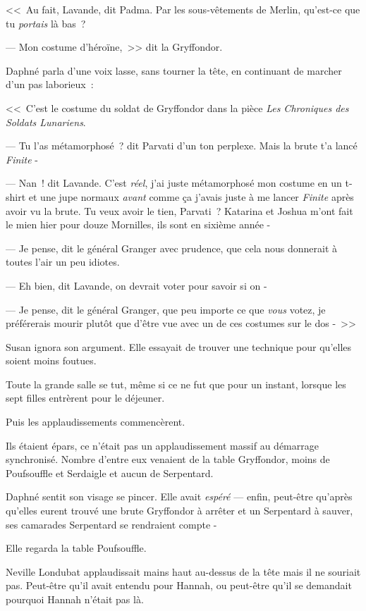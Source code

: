<<~Au fait, Lavande, dit Padma. Par les sous-vêtements de Merlin, qu'est-ce que tu \emph{portais} là bas~?

--- Mon costume d'héroïne,~>> dit la Gryffondor.

Daphné parla d'une voix lasse, sans tourner la tête, en continuant de marcher d'un pas laborieux~:

<<~C'est le costume du soldat de Gryffondor dans la pièce \emph{Les Chroniques des Soldats Lunariens}.

--- Tu l'as métamorphosé~? dit Parvati d'un ton perplexe. Mais la brute t'a lancé \emph{Finite} -

--- Nan~! dit Lavande. C'est \emph{réel}, j'ai juste métamorphosé mon costume en un t-shirt et une jupe normaux \emph{avant} comme ça j'avais juste à me lancer \emph{Finite} après avoir vu la brute. Tu veux avoir le tien, Parvati~? Katarina et Joshua m'ont fait le mien hier pour douze Mornilles, ils sont en sixième année -

--- Je pense, dit le général Granger avec prudence, que cela nous donnerait à toutes l'air un peu idiotes.

--- Eh bien, dit Lavande, on devrait voter pour savoir si on -

--- Je pense, dit le général Granger, que peu importe ce que \emph{vous} votez, je préférerais mourir plutôt que d'être vue avec un de ces costumes sur le dos -~>>

Susan ignora son argument. Elle essayait de trouver une technique pour qu'elles soient moins foutues.

\later

Toute la grande salle se tut, même si ce ne fut que pour un instant, lorsque les sept filles entrèrent pour le déjeuner.

Puis les applaudissements commencèrent.

Ils étaient épars, ce n'était pas un applaudissement massif au démarrage synchronisé. Nombre d'entre eux venaient de la table Gryffondor, moins de Poufsouffle et Serdaigle et aucun de Serpentard.

Daphné sentit son visage se pincer. Elle avait \emph{espéré} — enfin, peut-être qu'après qu'elles eurent trouvé une brute Gryffondor à arrêter et un Serpentard à sauver, ses camarades Serpentard se rendraient compte -

Elle regarda la table Poufsouffle.

Neville Londubat applaudissait mains haut au-dessus de la tête mais il ne souriait pas. Peut-être qu'il avait entendu pour Hannah, ou peut-être qu'il se demandait pourquoi Hannah n'était pas là.


